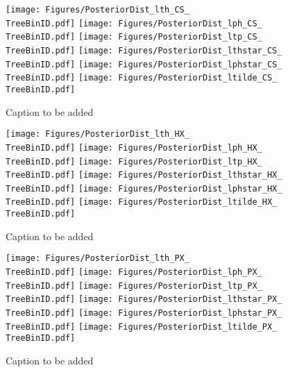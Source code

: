 \documentclass[12pt]{article}
\providecommand{\TreeBinID}[1]{TreeBinIDDefault_rap1pt1cpm1}%
\begin{document}
\begin{figure}[htbp]
\centering
\texttt{[image: Figures/PosteriorDist\_lth\_CS\_\\TreeBinID.pdf]}
\texttt{[image: Figures/PosteriorDist\_lph\_CS\_\\TreeBinID.pdf]}
\texttt{[image: Figures/PosteriorDist\_ltp\_CS\_\\TreeBinID.pdf]}
\texttt{[image: Figures/PosteriorDist\_lthstar\_CS\_\\TreeBinID.pdf]}
\texttt{[image: Figures/PosteriorDist\_lphstar\_CS\_\\TreeBinID.pdf]}
\texttt{[image: Figures/PosteriorDist\_ltilde\_CS\_\\TreeBinID.pdf]}
\caption{Caption to be added}
\end{figure}
\clearpage

\begin{figure}[htbp]
\centering
\texttt{[image: Figures/PosteriorDist\_lth\_HX\_\\TreeBinID.pdf]}
\texttt{[image: Figures/PosteriorDist\_lph\_HX\_\\TreeBinID.pdf]}
\texttt{[image: Figures/PosteriorDist\_ltp\_HX\_\\TreeBinID.pdf]}
\texttt{[image: Figures/PosteriorDist\_lthstar\_HX\_\\TreeBinID.pdf]}
\texttt{[image: Figures/PosteriorDist\_lphstar\_HX\_\\TreeBinID.pdf]}
\texttt{[image: Figures/PosteriorDist\_ltilde\_HX\_\\TreeBinID.pdf]}
\caption{Caption to be added}
\end{figure}
\clearpage

\begin{figure}[htbp]
\centering
\texttt{[image: Figures/PosteriorDist\_lth\_PX\_\\TreeBinID.pdf]}
\texttt{[image: Figures/PosteriorDist\_lph\_PX\_\\TreeBinID.pdf]}
\texttt{[image: Figures/PosteriorDist\_ltp\_PX\_\\TreeBinID.pdf]}
\texttt{[image: Figures/PosteriorDist\_lthstar\_PX\_\\TreeBinID.pdf]}
\texttt{[image: Figures/PosteriorDist\_lphstar\_PX\_\\TreeBinID.pdf]}
\texttt{[image: Figures/PosteriorDist\_ltilde\_PX\_\\TreeBinID.pdf]}
\caption{Caption to be added}
\end{figure}
\clearpage
\end{document}
